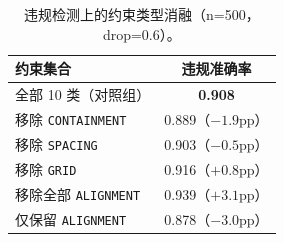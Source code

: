\documentclass[11pt, letterpaper]{ctexart}
\begin{document}
\begin{table}[htbp]
\caption{违规检测上的约束类型消融（n=500，drop=0.6）。}
\label{tab:ablation}
\centering
\begin{tabularx}{\textwidth}{Xc}
\toprule
\textbf{约束集合} & \textbf{违规准确率} \\
\midrule
全部 10 类（对照组） & \textbf{0.908} \\
移除 \texttt{CONTAINMENT} & 0.889（$-1.9$pp） \\
移除 \texttt{SPACING} & 0.903（$-0.5$pp） \\
移除 \texttt{GRID} & 0.916（$+0.8$pp） \\
移除全部 \texttt{ALIGNMENT} & 0.939（$+3.1$pp） \\
仅保留 \texttt{ALIGNMENT} & 0.878（$-3.0$pp） \\
\bottomrule
\end{tabularx}
\end{table}
\end{document}
